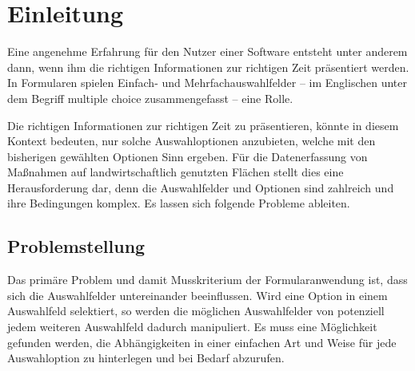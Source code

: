\chapter{Einleitung}

Eine angenehme Erfahrung für den Nutzer einer Software entsteht unter anderem dann,
wenn ihm die richtigen Informationen zur richtigen Zeit präsentiert werden.
In Formularen spielen Einfach- und Mehrfachauswahlfelder
-- im Englischen unter dem Begriff multiple choice zusammengefasst -- eine Rolle.



Die richtigen Informationen zur richtigen Zeit zu präsentieren, könnte in diesem Kontext bedeuten,
nur solche Auswahloptionen anzubieten,
welche mit den bisherigen gewählten Optionen Sinn ergeben.
Für die Datenerfassung von Maßnahmen auf landwirtschaftlich genutzten Flächen stellt dies eine Herausforderung dar,
denn die Auswahlfelder und Optionen sind zahlreich und ihre Bedingungen komplex.
Es lassen sich folgende Probleme ableiten. 

\section{Problemstellung}

Das primäre Problem und damit Musskriterium der Formularanwendung ist,
dass sich die Auswahlfelder untereinander beeinflussen.
Wird eine Option in einem Auswahlfeld selektiert,
so werden die möglichen Auswahlfelder von potenziell jedem weiteren Auswahlfeld dadurch manipuliert.
Es muss eine Möglichkeit gefunden werden,
die Abhängigkeiten in einer einfachen Art und Weise für jede Auswahloption zu hinterlegen und bei Bedarf abzurufen.


